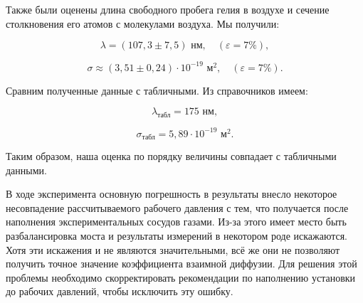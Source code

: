 \documentclass[a4paper,12pt]{article} %
\begin{document}
Также были оценены длина свободного пробега гелия в воздухе и сечение столкновения его атомов с молекулами воздуха. Мы получили:

\[ \boxed{\lambda = (107,3 \pm 7,5) \text{ нм}}, \quad (\varepsilon = 7\%),\]

\[ \boxed{\sigma \approx (3,51 \pm 0,24) \cdot 10^{-19} \text{ м}^2}, \quad (\varepsilon = 7\%).\]

Сравним полученные данные с табличными. Из справочников имеем:

\[ \lambda_\text{табл} = 175 \text{ нм}, \]

\[ \sigma_\text{табл} = 5,89  \cdot 10^{-19} \text{ м}^2.\]

Таким образом, наша оценка по порядку величины совпадает с табличными данными.

В ходе эксперимента основную погрешность в результаты внесло некоторое несовпадение рассчитываемого рабочего давления с тем, что получается после наполнения экспериментальных сосудов газами. Из-за этого имеет место быть разбалансировка моста и результаты измерений в некотором роде искажаются. Хотя эти искажения и не являются значительными, всё же они не позволяют получить точное значение коэффициента взаимной диффузии. Для решения этой проблемы необходимо скорректировать рекомендации по наполнению установки до рабочих давлений, чтобы исключить эту ошибку.






\newpage
\end{document}

